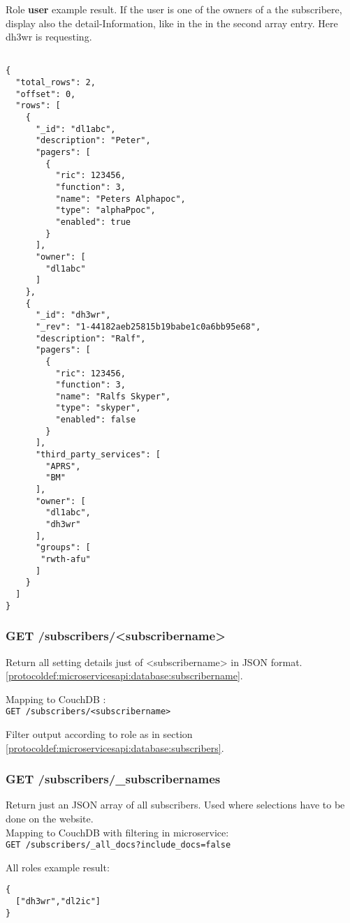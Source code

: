 Role \textbf{user} example result. If the user is one of the owners of a the subscribere, display also the detail-Information, like in the in the second array entry. Here dh3wr is requesting.
\begin{lstlisting}

{
  "total_rows": 2,
  "offset": 0,
  "rows": [
    {
      "_id": "dl1abc",
      "description": "Peter",
      "pagers": [
        {
          "ric": 123456,
          "function": 3,
          "name": "Peters Alphapoc",
          "type": "alphaPpoc",
          "enabled": true
        }
      ],
      "owner": [
        "dl1abc"
      ]
    },
    {
      "_id": "dh3wr",
      "_rev": "1-44182aeb25815b19babe1c0a6bb95e68",
      "description": "Ralf",
      "pagers": [
        {
          "ric": 123456,
          "function": 3,
          "name": "Ralfs Skyper",
          "type": "skyper",
          "enabled": false
        }
      ],
      "third_party_services": [
        "APRS",
        "BM"
      ],
      "owner": [
        "dl1abc",
        "dh3wr"
      ],
      "groups": [
       "rwth-afu"
      ]
    }
  ]
}
\end{lstlisting}


\subsubsection{GET /subscribers/<subscribername>}
\label{protocoldef:microservicesapi:database:getrubricname}
Return all setting details just of <subscribername> in JSON format. \ref{protocoldef:microservicesapi:database:subscribername}.

Mapping to CouchDB :\\
\verb|GET /subscribers/<subscribername>|

Filter output according to role as in section \ref{protocoldef:microservicesapi:database:subscribers}.

\subsubsection{GET /subscribers/\_subscribernames}
Return just an JSON array of all subscribers. Used where selections have to be done on the website.\\
Mapping to CouchDB with filtering in microservice:\\
\verb|GET /subscribers/_all_docs?include_docs=false|

All roles example result:
\begin{lstlisting}
{
  ["dh3wr","dl2ic"]
}
\end{lstlisting}

